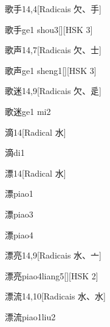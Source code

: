 \begin{entry}{歌手}{14,4}[Radicais ⽋、⼿]
  \begin{phonetics}{歌手}{ge1 shou3}[][HSK 3]
  \end{phonetics}
\end{entry}

\begin{entry}{歌声}{14,7}[Radicais ⽋、⼠]
  \begin{phonetics}{歌声}{ge1 sheng1}[][HSK 3]
  \end{phonetics}
\end{entry}

\begin{entry}{歌迷}{14,9}[Radicais ⽋、⾡]
  \begin{phonetics}{歌迷}{ge1 mi2}
  \end{phonetics}
\end{entry}

\begin{entry}{滴}{14}[Radical ⽔]
  \begin{phonetics}{滴}{di1}
  \end{phonetics}
\end{entry}

\begin{entry}{漂}{14}[Radical ⽔]
  \begin{phonetics}{漂}{piao1}
  \end{phonetics}
  \begin{phonetics}{漂}{piao3}
  \end{phonetics}
  \begin{phonetics}{漂}{piao4}
  \end{phonetics}
\end{entry}

\begin{entry}{漂亮}{14,9}[Radicais ⽔、⼇]
  \begin{phonetics}{漂亮}{piao4liang5}[][HSK 2]
  \end{phonetics}
\end{entry}

\begin{entry}{漂流}{14,10}[Radicais ⽔、⽔]
  \begin{phonetics}{漂流}{piao1liu2}
  \end{phonetics}
\end{entry}

